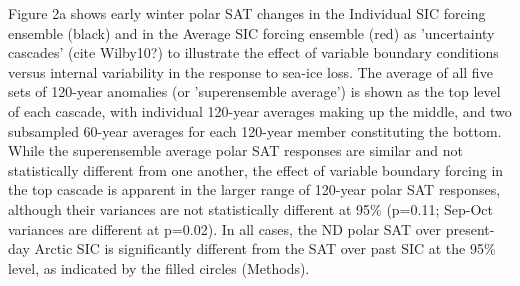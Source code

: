 \documentclass[grl]{AGUTeX}  %
\begin{document}
\begin{article}
Figure 2a shows early winter polar SAT changes in the Individual SIC forcing ensemble (black) and in the Average SIC forcing ensemble (red) as 'uncertainty cascades' (cite Wilby10?) to illustrate the effect of variable boundary conditions versus internal variability in the response to sea-ice loss. The average of all five sets of 120-year anomalies (or 'superensemble average') is shown as the top level of each cascade, with individual 120-year averages making up the middle, and two subsampled 60-year averages for each 120-year member constituting the bottom. While the superensemble average polar SAT responses are similar and not statistically different from one another, the effect of variable boundary forcing in the top cascade is apparent in the larger range of 120-year polar SAT responses, although their variances are not statistically different at 95\% (p=0.11; Sep-Oct variances are different at p=0.02). In all cases, the ND polar SAT over present-day Arctic SIC is significantly different from the SAT over past SIC at the 95\% level, as indicated by the filled circles (Methods). %


\end{article}
\end{document}

